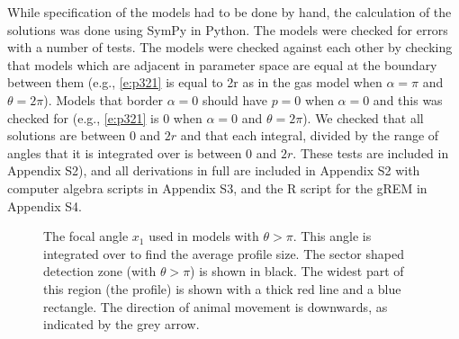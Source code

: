 \documentclass[a4paper,10pt,reqno,oneside]{amsart}
\begin{document}
While specification of the models had to be done by hand, the calculation of the solutions was done using SymPy \citep{sympy} in Python. The models were checked for errors with a number of tests. The models were checked against each other by checking that models which are adjacent in parameter space are equal at the boundary between them (e.g., \ref{e:p321} is equal to 2r as in the gas model when $\alpha=\pi$ and $\theta=2\pi$). Models that border $ \alpha = 0$ should have $p = 0$ when $ \alpha = 0$ and this was checked for (e.g., \ref{e:p321} is 0 when $\alpha=0$ and $\theta=2\pi$). We checked that all solutions are between 0 and $2r$ and that each integral, divided by the range of angles that it is integrated over is between 0 and $2r$. These tests are included in Appendix S2), and all derivations in full are included in Appendix S2 with computer algebra scripts in Appendix S3, and the R \citep{} script for the gREM in Appendix S4.  

\begin{figure}[t]
        \centering
\caption{The focal angle $x_1$ used in models with $\theta>\pi$. This angle is integrated over to find the average profile size. The sector shaped detection zone (with $\theta>\pi$) is shown in black. The widest part of this region (the profile) is shown with a thick red line and a blue rectangle. The direction of animal movement is downwards, as indicated by the grey arrow. 
     }
\label{f:x1}
\end{figure}
\end{document}
